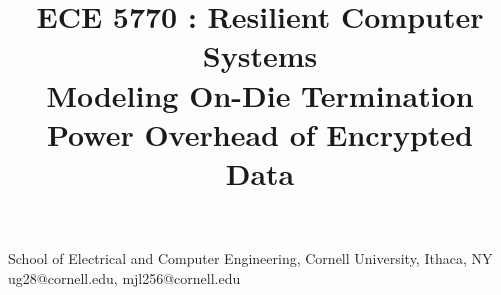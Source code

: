 \documentclass[10pt,nocopyrightspace]{sigplanconf}
\begin{document}
\renewcommand{\thesubfigure}{(\alph{subfigure})}
\title{ECE 5770 : Resilient Computer Systems \\
Modeling On-Die Termination Power Overhead of Encrypted Data}

{School of Electrical and Computer Engineering, Cornell University, Ithaca, NY}
{ug28@cornell.edu, mjl256@cornell.edu}

\maketitle













\end{document}

